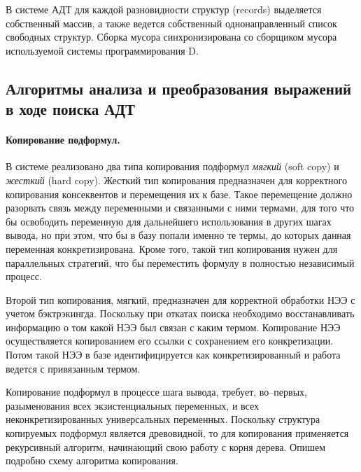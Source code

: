В системе АДТ для каждой разновидности структур (records) выделяется собственный массив, а также ведется собственный однонаправленный список свободных структур. Сборка мусора синхронизирована со сборщиком мусора используемой системы программирования D.

\subsection{Алгоритмы анализа и преобразования выражений в ходе поиска АДТ}

\paragraph{Копирование подформул.}
В системе реализовано два типа копирования подформул \emph{мягкий} (soft copy) и \emph{жесткий} (hard copy). Жесткий тип копирования предназначен для корректного копирования консеквентов и перемещения их к базе. Такое перемещение должно разорвать связь между переменными и связанными с ними термами, для того что бы освободить переменную для дальнейшего использования в других шагах вывода, но при этом, что бы в базу попали именно те термы, до которых данная переменная конкретизирована. Кроме того, такой тип копирования нужен для параллельных стратегий, что бы переместить формулу в полностью независимый процесс.

Второй тип копирования, мягкий, предназначен для корректной обработки НЭЭ с учетом бэктрэкингда. Поскольку при откатах поиска необходимо восстанавливать информацию о том какой НЭЭ был связан с каким термом. Копирование НЭЭ осуществляется копированием его ссылки с сохранением его конкретизации. Потом такой НЭЭ в базе идентифицируется как конкретизированный и работа ведется с привязанным термом.

Копирование подформул в процессе шага вывода, требует, во--первых, разыменования всех экзистенциальных переменных, и всех неконкретизированных универсальных переменных. Поскольку структура копируемых подформул является древовидной, то для копирования применяется рекурсивный алгоритм, начинающий свою работу с корня дерева. Опишем подробно схему алгоритма копирования.

